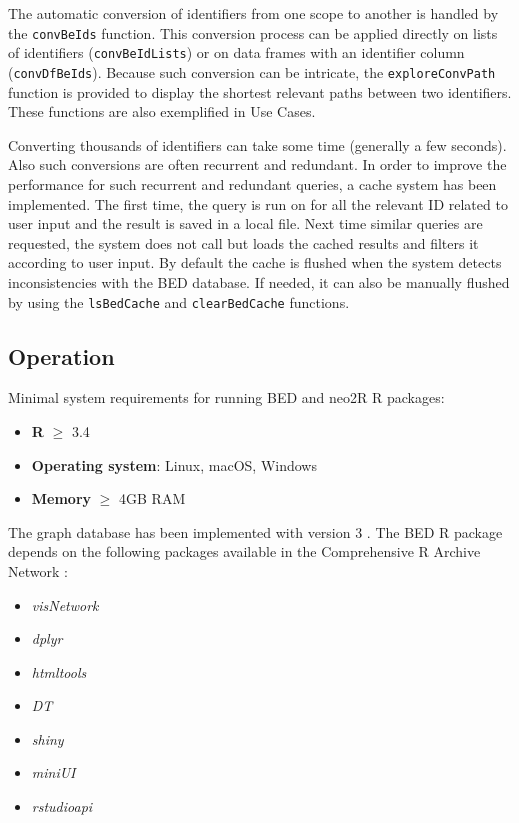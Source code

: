 \documentclass[9pt,a4paper,]{extarticle}
\theoremstyle{definition}
\theoremstyle{definition}
\theoremstyle{definition}
\theoremstyle{remark}
\begin{document}
The automatic conversion of identifiers from one scope to another is handled
by the \texttt{convBeIds} function.
This conversion process can be applied directly
on lists of identifiers (\texttt{convBeIdLists})
or on data frames with an identifier column (\texttt{convDfBeIds}).
Because such conversion can be intricate, the \texttt{exploreConvPath} function
is provided to display the shortest relevant paths between two identifiers.
These functions are also exemplified in Use Cases.

Converting thousands of identifiers can take some time
(generally a few seconds). Also such conversions are often recurrent and
redundant. In order to improve the performance for such recurrent and redundant
queries, a cache system has been implemented. The first time, the query is run
on \neo{} for all the relevant ID related to user input and the result is saved
in a local file. Next time similar queries are requested, the system does
not call \neo{} but loads the cached results and filters it according
to user input.
By default the cache is flushed when the system detects inconsistencies
with the BED database. If needed, it can also be manually flushed
by using the \texttt{lsBedCache} and \texttt{clearBedCache} functions.

\subsection{Operation}\label{operation}

Minimal system requirements for running BED and neo2R R packages:

\begin{itemize}
\item
  \textbf{R} \(\geq\) 3.4
\item
  \textbf{Operating system}: Linux, macOS, Windows
\item
  \textbf{Memory} \(\geq\) 4GB RAM
\end{itemize}

The graph database has been implemented
with \neo{} version 3 \citep{neo4j_inc_neo4j_2017}.
The BED R package depends on the following packages available in the
Comprehensive R Archive Network \citep{cran_comprehensive_nodate}:

\begin{itemize}
\item
  \emph{visNetwork} \citep{almende_b.v._visnetwork:_2017}
\item
  \emph{dplyr} \citep{wickham_dplyr:_2017}
\item
  \emph{htmltools} \citep{rstudio_inc_htmltools:_2017}
\item
  \emph{DT} \citep{xie_dt:_2016}
\item
  \emph{shiny} \citep{chang_shiny:_2017}
\item
  \emph{miniUI} \citep{cheng_miniui:_2016}
\item
  \emph{rstudioapi} \citep{allaire_rstudioapi:_2017}
\end{itemize}
\end{document}
